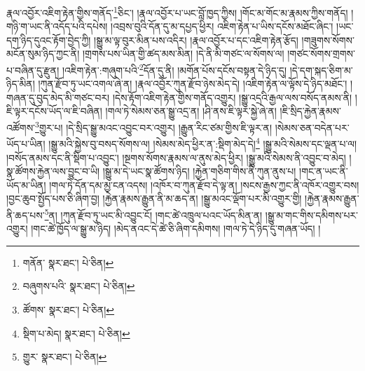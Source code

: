 རྣལ་འབྱོར་འཇིག་རྟེན་གྱིས་གནོད་\footnote{གནོན་  སྣར་ཐང་།  པེ་ཅིན། }ཅིང་། །རྣལ་འབྱོར་པ་ཡང་བློ་ཁྱད་ཀྱིས། །གོང་མ་གོང་མ་རྣམས་ཀྱིས་གནོད། །གཉི་ག་ཡང་ནི་འདོད་པའི་དཔེས། །འབྲས་བུའི་དོན་དུ་མ་དཔྱད་ཕྱིར། འཇིག་རྟེན་པ་ཡིས་དངོས་མཐོང་ཞིང་། །ཡང་དག་ཉིད་དུའང་རྟོག་བྱེད་ཀྱི། །སྒྱུ་མ་ལྟ་བུར་མིན་པས་འདིར། །རྣལ་འབྱོར་པ་དང་འཇིག་རྟེན་རྩོད། །གཟུགས་སོགས་མངོན་སུམ་ཉིད་ཀྱང་ནི། །གྲགས་པས་ཡིན་གྱི་ཚད་མས་མིན། །དེ་ནི་མི་གཙང་ལ་སོགས་ལ། །གཙང་སོགས་གྲགས་པ་བཞིན་དུ་རྫུན། །འཇིག་རྟེན་:གཞུག་པའི་\footnote{བཞུགས་པའི་  སྣར་ཐང་།  པེ་ཅིན། }དོན་དུ་ནི། །མགོན་པོས་དངོས་བསྟན་དེ་ཉིད་དུ། །དེ་དག་སྐད་ཅིག་མ་ཉིད་མིན། །ཀུན་རྫོབ་ཏུ་ཡང་འགལ་ཞེ་ན། །རྣལ་འབྱོར་ཀུན་རྫོབ་ཉེས་མེད་དེ། །འཇིག་རྟེན་ལ་ལྟོས་དེ་ཉིད་མཐོང་། །གཞན་དུ་བུད་མེད་མི་གཙང་བར། །དེས་རྟོག་འཇིག་རྟེན་གྱིས་གནོད་འགྱུར། །སྒྱུ་འདྲའི་རྒྱལ་ལས་བསོད་ནམས་ནི། །ཇི་ལྟར་དངོས་ཡོད་ལ་ཇི་བཞིན། །གལ་ཏེ་སེམས་ཅན་སྒྱུ་འདྲ་ན། །ཤི་ནས་ཇི་ལྟར་སྐྱེ་ཞེ་ན། །ཇི་སྲིད་རྐྱེན་རྣམས་འཚོགས་\footnote{ཚོགས་  སྣར་ཐང་།  པེ་ཅིན། }གྱུར་པ། །དེ་སྲིད་སྒྱུ་མའང་འབྱུང་བར་འགྱུར། །རྒྱུན་རིང་ཙམ་གྱིས་ཇི་ལྟར་ན། །སེམས་ཅན་བདེན་པར་ཡོད་པ་ཡིན། །སྒྱུ་མའི་སྐྱེས་བུ་བསད་སོགས་ལ། །སེམས་མེད་ཕྱིར་ན་:སྡིག་མེད་དེ།\footnote{སྡིག་པ་མེད།  སྣར་ཐང་།  པེ་ཅིན། } །སྒྱུ་མའི་སེམས་དང་ལྡན་པ་ལ། །བསོད་ནམས་དང་ནི་སྡིག་པ་འབྱུང་། །སྔགས་སོགས་རྣམས་ལ་ནུས་མེད་ཕྱིར། །སྒྱུ་མའི་སེམས་ནི་འབྱུང་བ་མེད། །སྣ་ཚོགས་རྐྱེན་ལས་བྱུང་བ་ཡི། །སྒྱུ་མ་དེ་ཡང་སྣ་ཚོགས་ཉིད། །རྐྱེན་གཅིག་གིས་ནི་ཀུན་ནུས་པ། །གང་ན་ཡང་ནི་ཡོད་མ་ཡིན། །གལ་ཏེ་དོན་དམ་མྱ་ངན་འདས། །འཁོར་བ་ཀུན་རྫོབ་དེ་ལྟ་ན། །སངས་རྒྱས་ཀྱང་ནི་འཁོར་འགྱུར་བས། །བྱང་ཆུབ་སྤྱོད་པས་ཅི་ཞིག་བྱ། །རྐྱེན་རྣམས་རྒྱུན་ནི་མ་ཆད་ན། །སྒྱུ་མའང་ལྡོག་པར་མི་འགྱུར་གྱི། །རྐྱེན་རྣམས་རྒྱུན་ནི་ཆད་པས་\footnote{གྱུར་  སྣར་ཐང་།  པེ་ཅིན། }ན། །ཀུན་རྫོབ་ཏུ་ཡང་མི་འབྱུང་ངོ། །གང་ཚེ་འཁྲུལ་པའང་ཡོད་མིན་ན། །སྒྱུ་མ་གང་གིས་དམིགས་པར་འགྱུར། །གང་ཚེ་ཁྱོད་ལ་སྒྱུ་མ་ཉིད། །མེད་ནའང་དེ་ཚེ་ཅི་ཞིག་དམིགས། །གལ་ཏེ་དེ་ཉིད་དུ་གཞན་ཡོད། །
